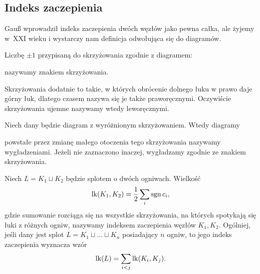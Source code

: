 \subsection{Indeks zaczepienia}
Gauß wprowadził indeks zaczepienia dwóch węzłów jako pewna całka, ale żyjemy w~XXI wieku i wystarczy nam definicja odwołująca się do diagramów.

\begin{definition}[znak]
%
    Liczbę $\pm 1$ przypisaną do skrzyżowania zgodnie z diagramem:
\begin{comment}
    \[
        \sign \left( \MediumSkeinPlus  \right) = +1 \quad
        \sign \left( \MediumSkeinMinus \right) = -1
    \]
\end{comment}
    nazywamy znakiem skrzyżowania.
\end{definition}

Skrzyżowania dodatnie to takie, w których obrócenie dolnego łuku w prawo daje górny łuk, dlatego czasem nazywa się je także praworęcznymi.
Oczywiście skrzyżowania ujemne nazywamy wtedy leworęcznymi.
%
%

\begin{definition}[wygładzenie]
%
    Niech dany będzie diagram z wyróżnionym skrzyżowaniem.
    Wtedy diagramy
\begin{comment}
    \begin{figure}[H]
        \begin{minipage}[b]{.48\linewidth}
            \[
                \RightCrossSmoothing
            \]
            \subcaption{wygładzenie dodatnie}
        \end{minipage}
        \begin{minipage}[b]{.48\linewidth}
            \[
                \LeftCrossSmoothing
            \]
            \subcaption{wygładzenie ujemne}
        \end{minipage}
    \end{figure}
\end{comment}
    powstałe przez zmianę małego otoczenia tego skrzyżowania nazywamy wygładzeniami.
    Jeżeli nie zaznaczono inaczej, wygładzamy zgodnie ze znakiem skrzyżowania.
\end{definition}

\begin{definition}
%
    Niech $L = K_1 \sqcup K_2$ będzie splotem o dwóch ogniwach.
    Wielkość
    \begin{equation}
        \operatorname{lk}(K_1, K_2) = \frac 12 \sum_i \operatorname{sgn} c_i,
    \end{equation}
    gdzie sumowanie rozciąga się na wszystkie skrzyżowania, na których spotykają się łuki z różnych ogniw, nazywamy indeksem zaczepienia węzłów $K_1, K_2$.
    Ogólniej, jeśli dany jest splot $L = K_1 \sqcup \ldots \sqcup K_n$ posiadający $n$ ogniw, to jego indeks zaczepienia wyznacza wzór
    \begin{equation}
        \operatorname{lk}(L) = \sum_{i < j} \operatorname{lk}(K_i, K_j).
    \end{equation}
\end{definition}

